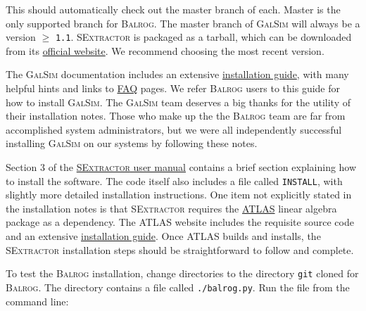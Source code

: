 \documentclass[11pt]{book}
\newcommand{\codett}[1]{\lstinline{#1}}
\newcommand{\galsim}{\textsc{GalSim}}
\newcommand{\balrog}{\textsc{Balrog}}
\newcommand{\sex}{\textsc{SExtractor}}
\begin{document}
\begin{cmdline}
\end{cmdline}

\noindent This should automatically check out the master branch of each.
Master is the only supported branch for \balrog{}. 
The master branch of \galsim{} will always be a version $\geq$ \codett{1.1}.
\sex{} is packaged as a tarball, which can be downloaded 
from its \href{https://www.astromatic.net/software/sextractor}{official website}.
We recommend choosing the most recent version.

The \galsim{} documentation includes an extensive
\href{https://github.com/GalSim-developers/GalSim/blob/releases/1.0/INSTALL.md}{installation guide},
with many helpful hints and links to \href{https://github.com/GalSim-developers/GalSim/wiki/Installation\%20FAQ}{FAQ} pages. 
We refer \balrog{} users to this guide for how to install \galsim{}.
The \galsim{} team deserves a big thanks for the utility of their installation notes.
Those who make up the the \balrog{} team are far from accomplished system administrators, 
but we were all independently successful installing \galsim{} on our systems by following these notes.

Section 3 of the \href{https://www.astromatic.net/pubsvn/software/sextractor/trunk/doc/sextractor.pdf}{\sex{} user manual}
contains a brief section explaining how to install the software. The code itself also includes a file called \codett{INSTALL}, with
slightly more detailed installation instructions.
One item not explicitly stated in the installation notes is that \sex{} requires the \href{http://math-atlas.sourceforge.net/}{ATLAS}
linear algebra package as a dependency.
The ATLAS website includes the requisite source code and
an extensive \href{http://math-atlas.sourceforge.net/atlas_install/}{installation guide}.
Once ATLAS builds and installs, the \sex{} installation steps should be straightforward to follow and complete.

To test the \balrog{} installation, change directories to the directory \codett{git} cloned for \balrog{}.
The directory contains a file called \codett{./balrog.py}. Run the file from the command line:

\begin{cmdline}
\end{cmdline}
\end{document}
